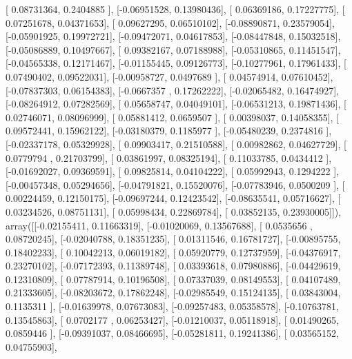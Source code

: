 \documentclass{article}
\begin{document}
       [ 0.08731364,  0.2404885 ],
       [-0.06951528,  0.13980436],
       [ 0.06369186,  0.17227775],
       [ 0.07251678,  0.04371653],
       [ 0.09627295,  0.06510102],
       [-0.08890871,  0.23579054],
       [-0.05901925,  0.19972721],
       [-0.09472071,  0.04617853],
       [-0.08447848,  0.15032518],
       [-0.05086889,  0.10497667],
       [ 0.09382167,  0.07188988],
       [-0.05310865,  0.11451547],
       [-0.04565338,  0.12171467],
       [-0.01155445,  0.09126773],
       [-0.10277961,  0.17961433],
       [ 0.07490402,  0.09522031],
       [-0.00958727,  0.0497689 ],
       [ 0.04574914,  0.07610452],
       [-0.07837303,  0.06154383],
       [-0.0667357 ,  0.17262222],
       [-0.02065482,  0.16474927],
       [-0.08264912,  0.07282569],
       [ 0.05658747,  0.04049101],
       [-0.06531213,  0.19871436],
       [ 0.02746071,  0.08096999],
       [ 0.05881412,  0.0659507 ],
       [ 0.00398037,  0.14058355],
       [ 0.09572441,  0.15962122],
       [-0.03180379,  0.1185977 ],
       [-0.05480239,  0.2374816 ],
       [-0.02337178,  0.05329928],
       [ 0.09903417,  0.21510588],
       [ 0.00982862,  0.04627729],
       [ 0.0779794 ,  0.21703799],
       [ 0.03861997,  0.08325194],
       [ 0.11033785,  0.0434412 ],
       [-0.01692027,  0.09369591],
       [ 0.09825814,  0.04104222],
       [ 0.05992943,  0.1294222 ],
       [-0.00457348,  0.05294656],
       [-0.04791821,  0.15520076],
       [-0.07783946,  0.0500209 ],
       [ 0.00224459,  0.12150175],
       [-0.09697244,  0.12423542],
       [-0.08635541,  0.05716627],
       [ 0.03234526,  0.08751131],
       [ 0.05998434,  0.22869784],
       [ 0.03852135,  0.23930005]]), array([[-0.02155411,  0.11663319],
       [-0.01020069,  0.13567688],
       [ 0.0535656 ,  0.08720245],
       [-0.02040788,  0.18351235],
       [ 0.01311546,  0.16781727],
       [-0.00895755,  0.18402233],
       [ 0.10042213,  0.06019182],
       [ 0.05920779,  0.12737959],
       [-0.04376917,  0.23270102],
       [-0.07172393,  0.11389748],
       [ 0.03393618,  0.07980886],
       [-0.04429619,  0.12310809],
       [ 0.07787914,  0.10196508],
       [ 0.07337039,  0.08149553],
       [ 0.04107489,  0.21333605],
       [-0.08203672,  0.17862248],
       [-0.02985549,  0.15124135],
       [ 0.03843004,  0.1135311 ],
       [-0.01639978,  0.07673083],
       [-0.09257483,  0.05358578],
       [-0.10763781,  0.13545863],
       [ 0.0702177 ,  0.06253427],
       [-0.01210037,  0.05118918],
       [ 0.01490265,  0.0859446 ],
       [-0.09391037,  0.08466695],
       [-0.05281811,  0.19241386],
       [ 0.03565152,  0.04755903],
\end{document}
